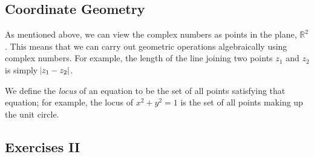 \documentclass[a4paper,10pt,titlepage]{article}
\theoremstyle{definition}
\begin{document}
\subsection*{Coordinate Geometry}
As mentioned above, we can view the complex numbers as points in the plane, $ \mathbb{R}^2 $. This means
that we can carry out geometric operations algebraically using complex numbers. For example, the length
of the line joining two points $ z_1 $ and $ z_2 $ is simply $ \abs{z_1 - z_2} $.

We define the \textit{locus} of an equation to be the set of all points satisfying that equation; for example,
the locus of $ x^2 + y^2 = 1 $ is the set of all points making up the unit circle.

\subsection*{Exercises II}
\end{document}
